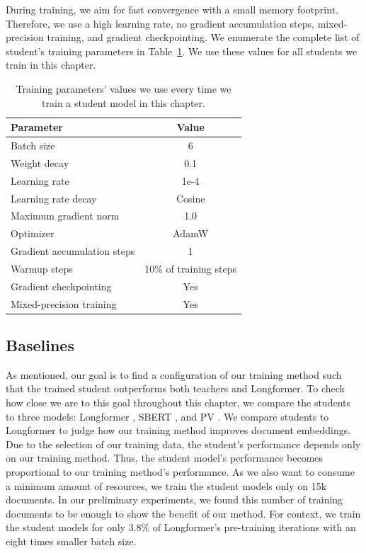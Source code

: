 During training, we aim for fast convergence with a small memory footprint. Therefore, we use a high learning rate, no gradient
accumulation steps, mixed-precision training, and gradient checkpointing. We
enumerate the complete list of student's training parameters in
Table~\ref{table:student_train_params}. We use these values for all students
we train in this chapter.


\begin{table}
  \centering
  \footnotesize

  \begin{tabular}{l c}
    \toprule
    Parameter & Value \\
    \midrule
    Batch size & 6 \\
    Weight decay & 0.1 \\
    Learning rate & 1e-4 \\
    Learning rate decay & Cosine \\
    Maximum gradient norm & 1.0 \\
    Optimizer & AdamW \\
    Gradient accumulation steps & 1 \\
    Warmup steps & 10\% of training steps \\
    Gradient checkpointing & Yes \\
    Mixed-precision training & Yes \\
    \bottomrule
  \end{tabular}

  \caption{Training parameters' values we use every time we train a student model in this chapter.}

  \label{table:student_train_params}

\end{table}

\subsection{Baselines}

As mentioned, our goal is to find a configuration of our training method such that the trained student outperforms both teachers and Longformer. To check how close we are to this goal
throughout this chapter, we compare the students to three models:
Longformer \citep{beltagy2020longformer}, SBERT \citep{reimers2019sentence},
and PV \citep{le2014distributed}. We compare students to Longformer to judge how our training method improves document embeddings. Due to the selection of our training data, the student's performance depends only on our training method. Thus, the student model's performance becomes proportional to our training method's performance. As we also want to consume a minimum amount of resources, we train the student models only on 15k documents. In our preliminary experiments, we found this number of training documents to be enough to show the benefit of our method. For context, we train the student models for only 3.8\% of Longformer's pre-training iterations with an eight times smaller batch size.

